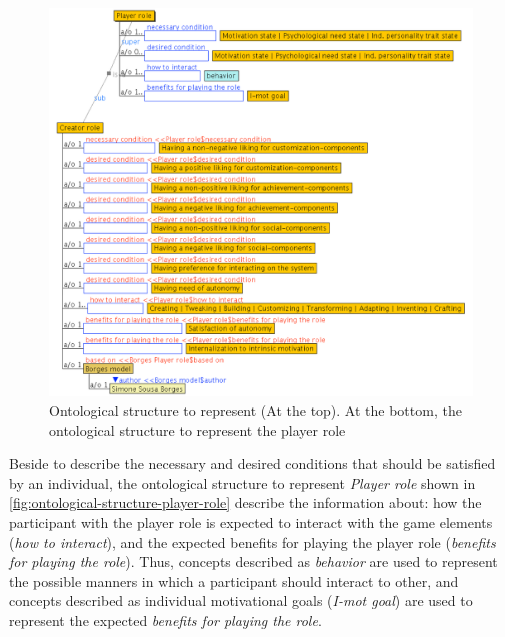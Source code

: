\begin{figure}[!htbp]
 \caption[Ontological structure to represent player role]{Ontological structure to represent  (At the top). At the bottom, the ontological structure to represent the player role }
 \label{fig:ontological-structure-player-role}
 \centering
 \includegraphics[width=1\textwidth]{images/chap-ontogacles1/ontological-structure-player-role.png}
 \fautor
\end{figure}

Beside to describe the necessary and desired conditions that should be satisfied by an individual, the ontological structure to represent \emph{Player role} shown in \autoref{fig:ontological-structure-player-role} describe the information about: how the participant with the player role is expected to interact with the game elements (\emph{how to interact}), and the expected benefits for playing the player role (\emph{benefits for playing the role}). Thus, concepts described as \emph{behavior} are used to represent the possible manners in which a participant should interact to other, and concepts described as individual motivational goals (\emph{I-mot goal}) are used to represent the expected \emph{benefits for playing the role}.

